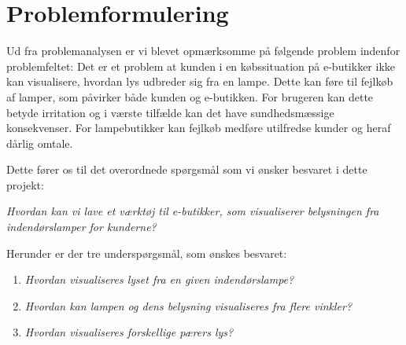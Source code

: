 \section{Problemformulering}
\label{sec:problemformulering}

Ud fra problemanalysen er vi blevet opmærksomme på følgende problem indenfor problemfeltet:
Det er et problem at kunden i en købssituation på e-butikker ikke kan visualisere, hvordan lys udbreder sig fra en lampe. Dette kan føre til fejlkøb af lamper, som påvirker både kunden og e-butikken. For brugeren kan dette betyde irritation og i værste tilfælde kan det have sundhedsmæssige konsekvenser. For lampebutikker kan fejlkøb medføre utilfredse kunder og heraf dårlig omtale. 

Dette fører os til det overordnede spørgsmål som vi ønsker besvaret i dette projekt:

\textit{Hvordan kan vi lave et værktøj til e-butikker, som visualiserer belysningen fra indendørslamper for kunderne?}

Herunder er der tre underspørgsmål, som ønskes besvaret:

\begin{enumerate}

\item \textit{Hvordan visualiseres lyset fra en given indendørslampe?}
\item \textit{Hvordan kan lampen og dens belysning visualiseres fra flere vinkler?}
\item \textit{Hvordan visualiseres forskellige pærers lys?}

\end{enumerate}

\clearpage